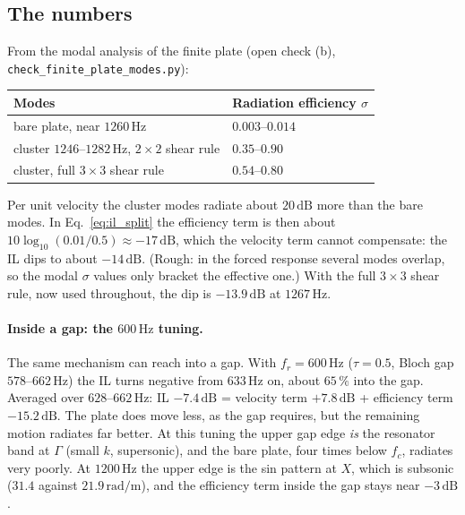 \subsection{The numbers}
From the modal analysis of the finite plate (open check (b),
\texttt{check\_finite\_plate\_modes.py}):
\begin{center}
\begin{tabular}{|l|l|}
\hline
Modes & Radiation efficiency $\sigma$ \\
\hline
bare plate, near $1260\,\mathrm{Hz}$ & $0.003$--$0.014$ \\
cluster $1246$--$1282\,\mathrm{Hz}$, $2\times 2$ shear rule & $0.35$--$0.90$ \\
cluster, full $3\times 3$ shear rule & $0.54$--$0.80$ \\
\hline
\end{tabular}
\end{center}
Per unit velocity the cluster modes radiate about $20\,\mathrm{dB}$ more than the bare
modes. In Eq.~\eqref{eq:il_split} the efficiency term is then about
$10\log_{10}(0.01/0.5) \approx -17\,\mathrm{dB}$, which the velocity term cannot
compensate: the IL dips to about $-14\,\mathrm{dB}$. (Rough: in the forced response
several modes overlap, so the modal $\sigma$ values only bracket the effective one.)
With the full $3\times 3$ shear rule, now used throughout, the dip is
$-13.9\,\mathrm{dB}$ at $1267\,\mathrm{Hz}$.

\paragraph{Inside a gap: the $600\,\mathrm{Hz}$ tuning.} The same mechanism can reach into
a gap. With $f_r = 600\,\mathrm{Hz}$ ($\tau = 0.5$, Bloch gap $578$--$662\,\mathrm{Hz}$) the
IL turns negative from $633\,\mathrm{Hz}$ on, about $65\,\%$ into the gap. Averaged over
$628$--$662\,\mathrm{Hz}$: IL $-7.4\,\mathrm{dB}$ = velocity term $+7.8\,\mathrm{dB}$ +
efficiency term $-15.2\,\mathrm{dB}$. The plate does move less, as the gap requires, but the
remaining motion radiates far better. At this tuning the upper gap edge \emph{is} the
resonator band at $\Gamma$ (small $k$, supersonic), and the bare plate, four times below
$f_c$, radiates very poorly. At $1200\,\mathrm{Hz}$ the upper edge is the sin pattern at
$X$, which is subsonic ($31.4$ against $21.9\,\mathrm{rad/m}$), and the efficiency term
inside the gap stays near $-3\,\mathrm{dB}$.

